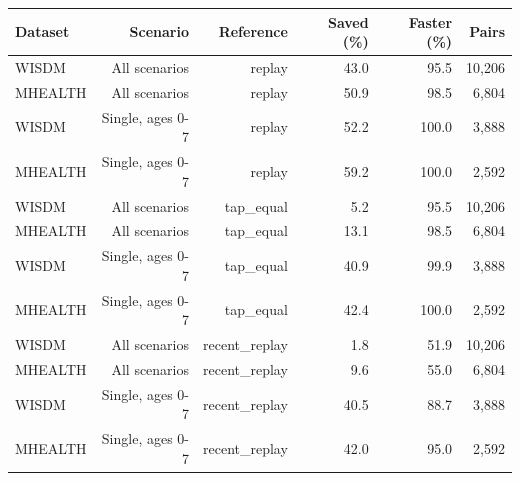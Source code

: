 \begin{tabular}{lrrrrr}
\toprule
Dataset & Scenario & Reference & Saved (\%) & Faster (\%) & Pairs \\
\midrule
WISDM & All scenarios & replay & 43.0 & 95.5 & 10,206 \\
MHEALTH & All scenarios & replay & 50.9 & 98.5 & 6,804 \\
WISDM & Single, ages 0-7 & replay & 52.2 & 100.0 & 3,888 \\
MHEALTH & Single, ages 0-7 & replay & 59.2 & 100.0 & 2,592 \\
WISDM & All scenarios & tap\_equal & 5.2 & 95.5 & 10,206 \\
MHEALTH & All scenarios & tap\_equal & 13.1 & 98.5 & 6,804 \\
WISDM & Single, ages 0-7 & tap\_equal & 40.9 & 99.9 & 3,888 \\
MHEALTH & Single, ages 0-7 & tap\_equal & 42.4 & 100.0 & 2,592 \\
WISDM & All scenarios & recent\_replay & 1.8 & 51.9 & 10,206 \\
MHEALTH & All scenarios & recent\_replay & 9.6 & 55.0 & 6,804 \\
WISDM & Single, ages 0-7 & recent\_replay & 40.5 & 88.7 & 3,888 \\
MHEALTH & Single, ages 0-7 & recent\_replay & 42.0 & 95.0 & 2,592 \\
\bottomrule
\end{tabular}
